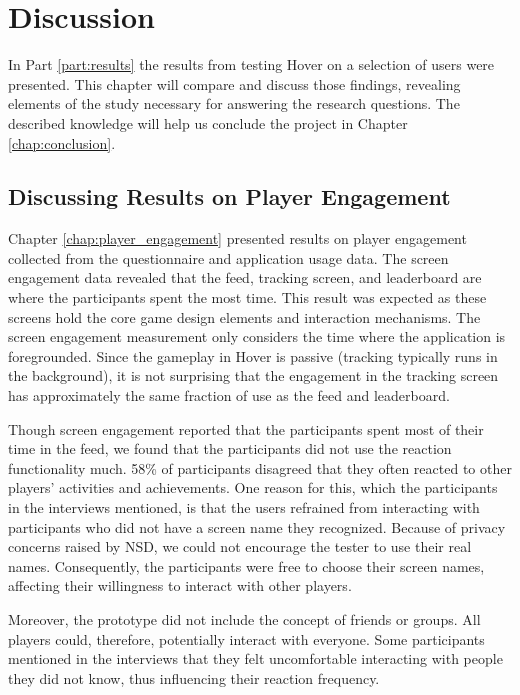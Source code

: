 \section{Discussion}
\label{chap:discussion}

In Part \ref{part:results} the results from testing Hover on a selection of users were presented. This chapter will compare and discuss those findings, revealing elements of the study necessary for answering the research questions. The described knowledge will help us conclude the project in Chapter \ref{chap:conclusion}.

\subsection{Discussing Results on Player Engagement}
Chapter \ref{chap:player_engagement} presented results on player engagement collected from the questionnaire and application usage data. The screen engagement data revealed that the feed, tracking screen, and leaderboard are where the participants spent the most time. This result was expected as these screens hold the core game design elements and interaction mechanisms. The screen engagement measurement only considers the time where the application is foregrounded. Since the gameplay in Hover is passive (tracking typically runs in the background), it is not surprising that the engagement in the tracking screen has approximately the same fraction of use as the feed and leaderboard.

Though screen engagement reported that the participants spent most of their time in the feed, we found that the participants did not use the reaction functionality much. 58\% of participants disagreed that they often reacted to other players' activities and achievements. One reason for this, which the participants in the interviews mentioned, is that the users refrained from interacting with participants who did not have a screen name they recognized. Because of privacy concerns raised by NSD, we could not encourage the tester to use their real names. Consequently, the participants were free to choose their screen names, affecting their willingness to interact with other players. 

Moreover, the prototype did not include the concept of friends or groups. All players could, therefore, potentially interact with everyone. Some participants mentioned in the interviews that they felt uncomfortable interacting with people they did not know, thus influencing their reaction frequency.

